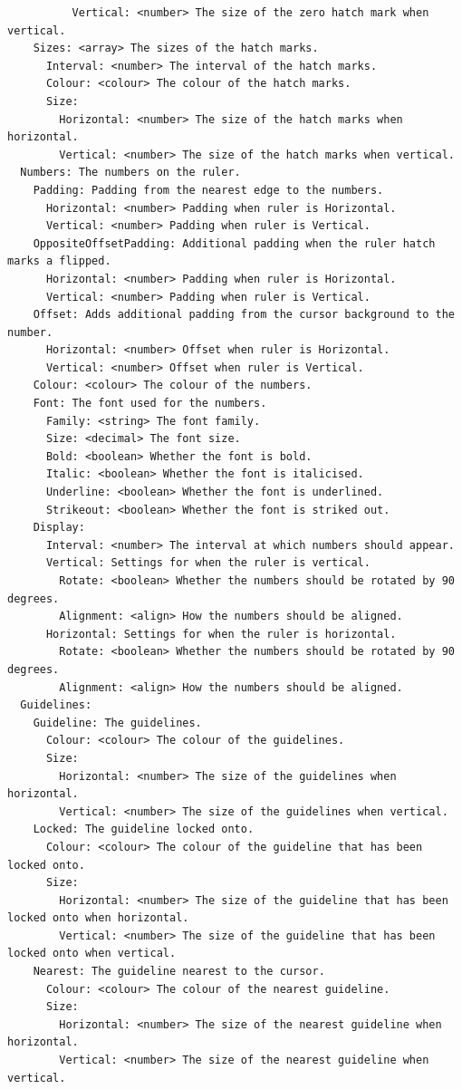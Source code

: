 \documentclass[
]{book}
\begin{document}
\begin{verbatim}
          Vertical: <number> The size of the zero hatch mark when vertical.
    Sizes: <array> The sizes of the hatch marks.
      Interval: <number> The interval of the hatch marks.
      Colour: <colour> The colour of the hatch marks.
      Size:
        Horizontal: <number> The size of the hatch marks when horizontal.
        Vertical: <number> The size of the hatch marks when vertical.
  Numbers: The numbers on the ruler.
    Padding: Padding from the nearest edge to the numbers.
      Horizontal: <number> Padding when ruler is Horizontal.
      Vertical: <number> Padding when ruler is Vertical.
    OppositeOffsetPadding: Additional padding when the ruler hatch marks a flipped.
      Horizontal: <number> Padding when ruler is Horizontal.
      Vertical: <number> Padding when ruler is Vertical.
    Offset: Adds additional padding from the cursor background to the number.
      Horizontal: <number> Offset when ruler is Horizontal.
      Vertical: <number> Offset when ruler is Vertical.
    Colour: <colour> The colour of the numbers.
    Font: The font used for the numbers.
      Family: <string> The font family.
      Size: <decimal> The font size.
      Bold: <boolean> Whether the font is bold.
      Italic: <boolean> Whether the font is italicised.
      Underline: <boolean> Whether the font is underlined.
      Strikeout: <boolean> Whether the font is striked out.
    Display:
      Interval: <number> The interval at which numbers should appear.
      Vertical: Settings for when the ruler is vertical.
        Rotate: <boolean> Whether the numbers should be rotated by 90 degrees.
        Alignment: <align> How the numbers should be aligned.
      Horizontal: Settings for when the ruler is horizontal.
        Rotate: <boolean> Whether the numbers should be rotated by 90 degrees.
        Alignment: <align> How the numbers should be aligned.
  Guidelines:
    Guideline: The guidelines.
      Colour: <colour> The colour of the guidelines.
      Size:
        Horizontal: <number> The size of the guidelines when horizontal.
        Vertical: <number> The size of the guidelines when vertical.
    Locked: The guideline locked onto.
      Colour: <colour> The colour of the guideline that has been locked onto.
      Size:
        Horizontal: <number> The size of the guideline that has been locked onto when horizontal.
        Vertical: <number> The size of the guideline that has been locked onto when vertical.
    Nearest: The guideline nearest to the cursor.
      Colour: <colour> The colour of the nearest guideline.
      Size:
        Horizontal: <number> The size of the nearest guideline when horizontal.
        Vertical: <number> The size of the nearest guideline when vertical.
\end{verbatim}
\end{document}
